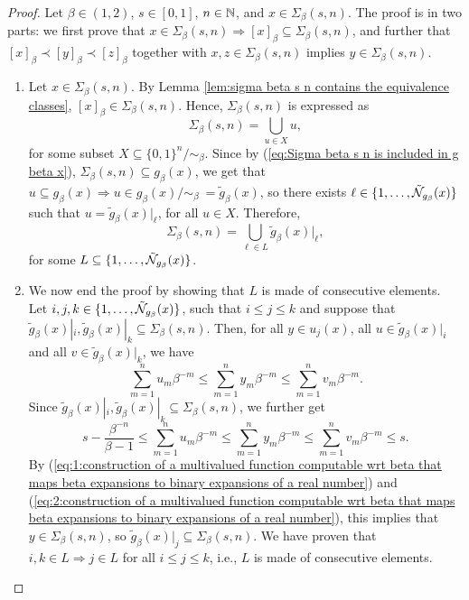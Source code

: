 \begin{proof}
    Let $\beta \in (1,2)$, $s \in [0,1]$, $n \in \mathbb{N}$, and $x \in \Sigma_\beta(s,n)$. The proof is in two parts: we first prove that $x \in \Sigma_\beta(s,n) \Rightarrow [x]_\beta \subseteq \Sigma_\beta(s,n)$, and further that $[x]_\beta \prec [y]_\beta \prec [z]_\beta$ together with $x,z \in \Sigma_\beta(s,n)$ implies $y \in \Sigma_\beta(s,n)$. 
    \begin{enumerate}[label = (\alph*)]
        \item Let $x \in \Sigma_\beta(s,n)$. By Lemma \ref{lem:sigma beta s n contains the equivalence classes}, $[x]_\beta \in \Sigma_\beta(s,n)$. Hence, $\Sigma_\beta(s,n)$ is expressed as 
        \begin{equation}
            \Sigma_\beta(s,n) = \bigcup_{u \in X} u,
        \end{equation}
        for some subset $X \subseteq \{0,1\}^n/ \sim_\beta$. Since by (\ref{eq:Sigma beta s n is included in g beta x}), $\Sigma_\beta(s,n) \subseteq g_\beta(x)$, we get that $u \subseteq g_\beta(x) \Rightarrow u \in g_\beta(x)/ \sim_\beta \ = \tilde g_\beta(x)$, so there exists $\ell \in \{1,\ldots, \tilde{\mathcal{N}}_{g_\beta} (x)\}$ such that $u = \tilde g_\beta(x)|_\ell$, for all $u \in X$. Therefore,
        \begin{equation}
            \Sigma_\beta(s,n) = \bigcup_{\ell \in L} \tilde g_\beta(x)|_\ell,
        \end{equation}
        for some $L \subseteq \{1, \ldots, \tilde {\mathcal{N}}_{g_\beta}(x)\}$.
        \item We now end the proof by showing that $L$ is made of consecutive elements. Let $i,j,k \in \{1, \ldots, \tilde {\mathcal{N}}_{g_\beta}(x)\}$, such that $i \leq j \leq k$ and suppose that $\tilde g_\beta(x)|_i, \tilde g_\beta(x)|_k \subseteq \Sigma_\beta(s,n)$. Then, for all $y \in u_j(x)$, all $u \in \tilde g_\beta(x)|_i$ and all $v \in \tilde g_\beta(x)|_k$, we have 
        \begin{equation}
            \sum_{m=1}^n u_m \beta^{-m} \leq \sum_{m=1}^n y_m \beta^{-m} \leq \sum_{m=1}^n v_m \beta^{-m}.
        \end{equation}
        Since $\tilde g_\beta(x)|_i, \tilde g_\beta(x)|_k \subseteq \Sigma_\beta(s,n)$, we further get
        \begin{equation}
            s - \frac{\beta^{-n}}{\beta-1} \leq \sum_{m=1}^n u_m \beta^{-m} \leq \sum_{m=1}^n y_m \beta^{-m} \leq \sum_{m=1}^n v_m \beta^{-m} \leq s.
        \end{equation}
        By (\ref{eq:1:construction of a multivalued function computable wrt beta that maps beta expansions to binary expansions of a real number}) and (\ref{eq:2:construction of a multivalued function computable wrt beta that maps beta expansions to binary expansions of a real number}), this implies that $y \in \Sigma_\beta(s,n)$, so $\tilde g_\beta(x)|_j \subseteq \Sigma_\beta(s,n)$. We have proven that $i,k \in L \Rightarrow j \in L$ for all $i \leq j \leq k$, i.e., $L$ is made of consecutive elements.
    \end{enumerate}
\end{proof}
